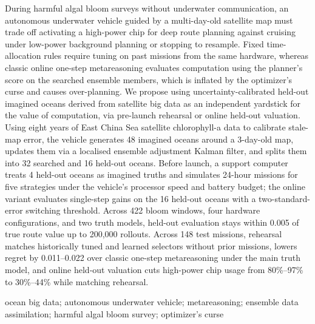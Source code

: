  During harmful algal bloom surveys without underwater communication, an autonomous underwater vehicle guided by a multi-day-old satellite map must trade off activating a high-power chip for deep route planning against cruising under low-power background planning or stopping to resample. Fixed time-allocation rules require tuning on past missions from the same hardware, whereas classic online one-step metareasoning evaluates computation using the planner's score on the searched ensemble members, which is inflated by the optimizer's curse and causes over-planning. We propose using uncertainty-calibrated held-out imagined oceans derived from satellite big data as an independent yardstick for the value of computation, via pre-launch rehearsal or online held-out valuation. Using eight years of East China Sea satellite chlorophyll-a data to calibrate stale-map error, the vehicle generates 48 imagined oceans around a 3-day-old map, updates them via a localised ensemble adjustment Kalman filter, and splits them into 32 searched and 16 held-out oceans. Before launch, a support computer treats 4 held-out oceans as imagined truths and simulates 24-hour missions for five strategies under the vehicle's processor speed and battery budget; the online variant evaluates single-step gains on the 16 held-out oceans with a two-standard-error switching threshold. Across 422 bloom windows, four hardware configurations, and two truth models, held-out evaluation stays within 0.005 of true route value up to 200,000 rollouts. Across 148 test missions, rehearsal matches historically tuned and learned selectors without prior missions, lowers regret by 0.011--0.022 over classic one-step metareasoning under the main truth model, and online held-out valuation cuts high-power chip usage from 80\%--97\% to 30\%--44\% while matching rehearsal.

\vspace{4pt}
 ocean big data; autonomous underwater vehicle; metareasoning; ensemble data assimilation; harmful algal bloom survey; optimizer's curse
